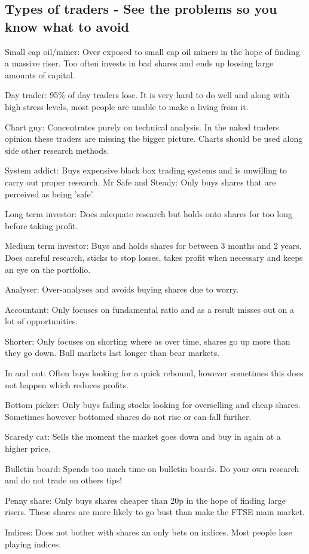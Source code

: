 \subsection*{Types of traders - See the problems so you know what to avoid}
\begin{enumerate*}
\item Small cap oil/miner: Over exposed to small cap oil miners in the hope of finding a massive riser.
Too often invests in bad shares and ends up loosing large amounts of capital. 
\item Day trader: 95\% of day traders lose.
It is very hard to do well and along with high stress levels, most people are unable to make a living from it.
\item Chart guy: Concentrates purely on technical analysis. 
In the naked traders opinion these traders are missing the bigger picture.
Charts should be used along side other research methods.
\item System addict: Buys expensive black box trading systems and is unwilling to carry out proper research.
Mr Safe and Steady: Only buys shares that are perceived as being 'safe'.
\item Long term investor: Does adequate research but holds onto shares for too long before taking profit.
\item Medium term investor: Buys and holds shares for between 3 months and 2 years. 
Does careful research, sticks to stop losses, takes profit when necessary and keeps an eye on the portfolio.
\item Analyser: Over-analyses and avoids buying shares due to worry.
\item Accountant: Only focuses on fundamental ratio and as a result misses out on a lot of opportunities.
\item Shorter: Only focuses on shorting where as over time, shares go up more than they go down.
Bull markets last longer than bear markets.
\item In and out: Often buys looking for a quick rebound, however sometimes this does not happen which reduces profits.
\item Bottom picker: Only buys failing stocks looking for overselling and cheap shares.
Sometimes however bottomed shares do not rise or can fall further.
\item Scaredy cat: Sells the moment the market goes down and buy in again at a higher price.
\item Bulletin board: Spends too much time on bulletin boards.
Do your own research and do not trade on others tips!
\item Penny share: Only buys shares cheaper than 20p in the hope of finding large risers.
These shares are more likely to go bust than make the FTSE main market.
\item Indices: Does not bother with shares an only bets on indices.
Most people lose playing indices.
\end{enumerate*}

